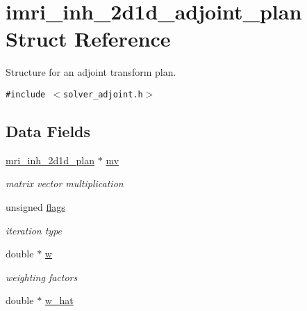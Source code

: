 \hypertarget{structimri__inh__2d1d__adjoint__plan}{
\section{imri\_\-inh\_\-2d1d\_\-adjoint\_\-plan Struct Reference}
\label{structimri__inh__2d1d__adjoint__plan}
}
Structure for an adjoint transform plan.  


{\tt \#include $<$solver\_\-adjoint.h$>$}

\subsection*{Data Fields}
\begin{CompactItemize}
\item 
\hypertarget{structimri__inh__2d1d__adjoint__plan_18f9b22f7f221aedc3dabab2cb07e633}{
\hyperlink{structmri__inh__2d1d__plan}{mri\_\-inh\_\-2d1d\_\-plan} $\ast$ \hyperlink{structimri__inh__2d1d__adjoint__plan_18f9b22f7f221aedc3dabab2cb07e633}{mv}}
\label{structimri__inh__2d1d__adjoint__plan_18f9b22f7f221aedc3dabab2cb07e633}

\begin{CompactList}\small\item\em matrix vector multiplication \item\end{CompactList}\item 
\hypertarget{structimri__inh__2d1d__adjoint__plan_dea4e1650ddadc3f0f7c1d833b6b7789}{
unsigned \hyperlink{structimri__inh__2d1d__adjoint__plan_dea4e1650ddadc3f0f7c1d833b6b7789}{flags}}
\label{structimri__inh__2d1d__adjoint__plan_dea4e1650ddadc3f0f7c1d833b6b7789}

\begin{CompactList}\small\item\em iteration type \item\end{CompactList}\item 
\hypertarget{structimri__inh__2d1d__adjoint__plan_552e0603ee92be729e052bb6028a1fb4}{
double $\ast$ \hyperlink{structimri__inh__2d1d__adjoint__plan_552e0603ee92be729e052bb6028a1fb4}{w}}
\label{structimri__inh__2d1d__adjoint__plan_552e0603ee92be729e052bb6028a1fb4}

\begin{CompactList}\small\item\em weighting factors \item\end{CompactList}\item 
\hypertarget{structimri__inh__2d1d__adjoint__plan_eb6a8106c1347dc7decf42e4520f70ab}{
double $\ast$ \hyperlink{structimri__inh__2d1d__adjoint__plan_eb6a8106c1347dc7decf42e4520f70ab}{w\_\-hat}}
\label{structimri__inh__2d1d__adjoint__plan_eb6a8106c1347dc7decf42e4520f70ab}


\end{CompactItemize}
